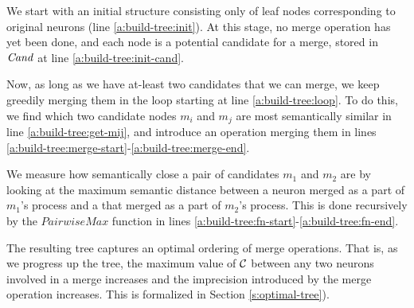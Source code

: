 We start with an initial structure
consisting only of leaf nodes corresponding to original neurons (line
\ref{a:build-tree:init}). At
this stage, no merge operation has yet been done, and each node is a potential
candidate for a merge, stored in $\mathit{Cand}$ at line
\ref{a:build-tree:init-cand}.

Now, as long as we have at-least two candidates that we can merge, we keep
greedily merging them in the loop starting at line \ref{a:build-tree:loop}. To
do this, we find which two candidate nodes $m_i$ and $m_j$ are most semantically
similar in line \ref{a:build-tree:get-mij}, and introduce an operation merging
them in lines \ref{a:build-tree:merge-start}-\ref{a:build-tree:merge-end}.

We measure how semantically close a pair of candidates $m_1$ and $m_2$ are by
looking at the maximum semantic distance between a neuron merged as a part of
$m_1$'s process and a that merged as a part of $m_2$'s process. This is done
recursively by the $\mathit{PairwiseMax}$ function in lines
\ref{a:build-tree:fn-start}-\ref{a:build-tree:fn-end}.

The resulting tree captures an optimal ordering of merge operations. 
That is, as we progress up the tree, the maximum value of $\mathcal{C}$ between any two
neurons involved in a merge increases and the imprecision
introduced by the merge operation increases. 
This is formalized in Section \ref{s:optimal-tree}). 


